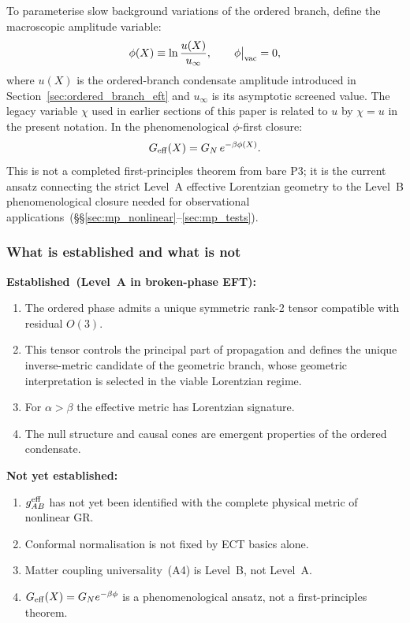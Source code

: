\documentclass[11pt,a4paper]{article}
\numberwithin{equation}{section}
\begin{document}
To parameterise slow background variations of the ordered branch, define
the macroscopic amplitude variable:
\begin{equation}
  \label{eq:phi_def}
  \phi(X)\equiv\ln\frac{u(X)}{u_\infty},
  \qquad \phi\big|_{\rm vac}=0,
\end{equation}
where $u(X)$ is the ordered-branch condensate amplitude introduced in
Section~\ref{sec:ordered_branch_eft} and $u_\infty$ is its asymptotic
screened value. The legacy variable $\chi$ used in earlier sections
of this paper is related to $u$ by $\chi = u$ in the present notation.
In the phenomenological $\phi$-first closure:
\begin{equation}
  \label{eq:Geff_phi}
  G_{\rm eff}(X)=G_N\,e^{-\beta\phi(X)}.
\end{equation}
This is not a completed first-principles theorem from bare P3; it is
the current ansatz connecting the strict Level~A effective Lorentzian
geometry to the Level~B phenomenological closure needed for
observational applications~(\S\S\ref{sec:mp_nonlinear}--\ref{sec:mp_tests}).

\subsubsection*{What is established and what is not}

\textbf{Established~(Level~A in broken-phase EFT):}
\begin{enumerate}[label=(\roman*)]
  \item The ordered phase admits a unique symmetric rank-2 tensor
    compatible with residual $O(3)$.
  \item This tensor controls the principal part of propagation and
    defines the unique inverse-metric candidate of the geometric branch,
    whose geometric interpretation is selected in the viable Lorentzian regime.
  \item For $\alpha>\beta$ the effective metric has Lorentzian signature.
  \item The null structure and causal cones are emergent properties of
    the ordered condensate.
\end{enumerate}

\textbf{Not yet established:}
\begin{enumerate}[label=(\roman*)]
  \item $g^{\rm eff}_{AB}$ has not yet been identified with the complete
    physical metric of nonlinear GR.
  \item Conformal normalisation is not fixed by ECT basics alone.
  \item Matter coupling universality~(A4) is Level~B, not Level~A.
  \item $G_{\rm eff}(X)=G_N e^{-\beta\phi}$ is a phenomenological ansatz,
    not a first-principles theorem.
\end{enumerate}
\end{document}

